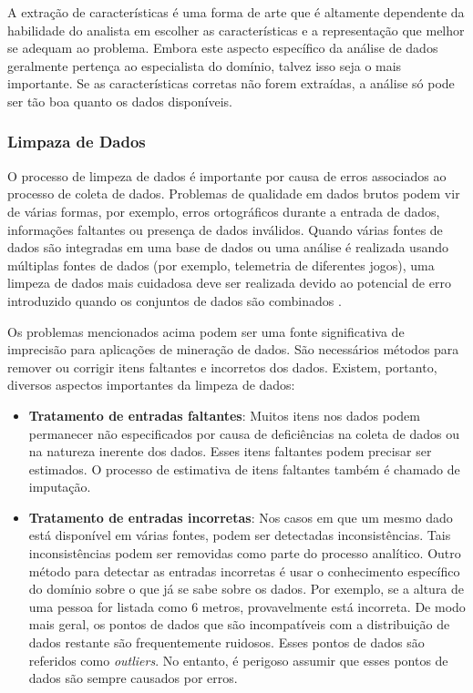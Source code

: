 A extração de características é uma forma de arte que é altamente dependente da habilidade do analista em escolher as características e a representação que melhor se adequam ao problema. Embora este aspecto específico da análise de dados geralmente pertença ao especialista do domínio, talvez isso seja o mais importante. Se as características corretas não forem extraídas, a análise só pode ser tão boa quanto os dados disponíveis.

\subsubsection{Limpaza de Dados}
O processo de limpeza de dados é importante por causa de erros associados ao processo de coleta de dados. Problemas de qualidade em dados brutos podem vir de várias formas, por exemplo, erros ortográficos durante a entrada de dados, informações faltantes ou presença de dados inválidos. Quando várias fontes de dados são integradas em uma base de dados ou uma análise  é realizada usando múltiplas fontes de dados (por exemplo, telemetria de diferentes jogos), uma limpeza de dados mais cuidadosa  deve ser realizada devido ao potencial de erro introduzido quando os conjuntos de dados são combinados \cite{el2016game}.

Os problemas mencionados acima podem ser uma fonte significativa de imprecisão para aplicações de mineração de dados. São necessários métodos para remover ou corrigir itens faltantes e incorretos dos dados. Existem, portanto, diversos aspectos importantes da limpeza de dados:

\begin{itemize}
  \item
\textbf{Tratamento de entradas faltantes}: Muitos itens nos dados podem permanecer não especificados por causa de deficiências na coleta de dados ou na natureza inerente dos dados. Esses itens faltantes podem precisar ser estimados. O processo de estimativa de itens faltantes também é chamado de imputação.
  \item
\textbf{Tratamento de entradas incorretas}: Nos casos em que um mesmo dado está disponível em várias fontes, podem ser detectadas inconsistências. Tais inconsistências podem ser removidas como parte do processo analítico. Outro método para detectar as entradas incorretas é usar o conhecimento específico do domínio sobre o que já se sabe sobre os dados. Por exemplo, se a altura de uma pessoa for listada como 6 metros, provavelmente está incorreta. De modo mais geral, os pontos de dados que são incompatíveis com a distribuição de dados restante são frequentemente ruidosos. Esses pontos de dados são referidos como \textit{outliers}. No entanto, é perigoso assumir que esses pontos de dados são sempre causados por erros.
\end{itemize}


